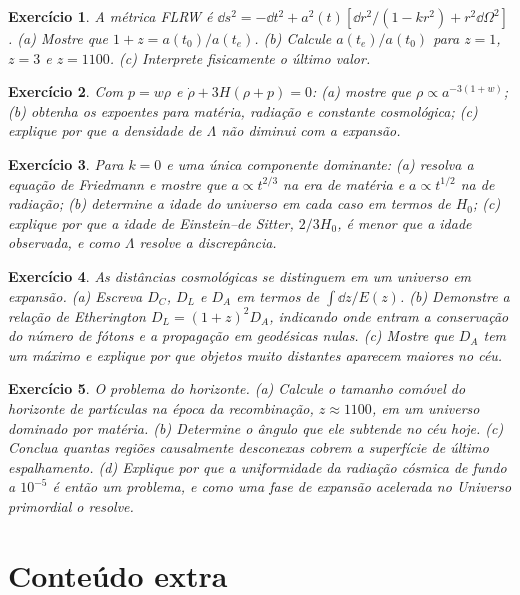 \documentclass[12pt,a4paper,oneside]{book}
\theoremstyle{rgplain}
\newtheorem{exercise}{Exercício}[chapter]
\theoremstyle{rgremark}
\begin{document}
\begin{exercise}
A métrica FLRW é
$\dd s^2=-\dd t^2+a^2(t)[\dd r^2/(1-kr^2)+r^2\dd\Omega^2]$.
(a) Mostre que $1+z=a(t_0)/a(t_e)$. (b) Calcule $a(t_e)/a(t_0)$ para
$z=1$, $z=3$ e $z=1100$. (c) Interprete fisicamente o último valor.
\end{exercise}

\begin{exercise}
Com $p=w\rho$ e $\dot\rho+3H(\rho+p)=0$: (a) mostre que
$\rho\propto a^{-3(1+w)}$; (b) obtenha os expoentes para matéria, radiação e
constante cosmológica; (c) explique por que a densidade de $\Lambda$ não
diminui com a expansão.
\end{exercise}

\begin{exercise}
Para $k=0$ e uma única componente dominante: (a) resolva a equação de
Friedmann e mostre que $a\propto t^{2/3}$ na era de matéria e
$a\propto t^{1/2}$ na de radiação; (b) determine a idade do universo em cada
caso em termos de $H_0$; (c) explique por que a idade de Einstein--de Sitter,
$2/3H_0$, é menor que a idade observada, e como $\Lambda$ resolve a
discrepância.
\end{exercise}

\begin{exercise}
As distâncias cosmológicas se distinguem em um universo em expansão.
(a) Escreva $D_C$, $D_L$ e $D_A$ em termos de $\int\dd z/E(z)$.
(b) Demonstre a relação de Etherington $D_L=(1+z)^2D_A$, indicando onde entram
a conservação do número de fótons e a propagação em geodésicas nulas.
(c) Mostre que $D_A$ tem um máximo e explique por que objetos muito distantes
aparecem \emph{maiores} no céu.
\end{exercise}

\begin{exercise}
O problema do horizonte. (a) Calcule o tamanho comóvel do horizonte de
partículas na época da recombinação, $z\approx1100$, em um universo dominado
por matéria. (b) Determine o ângulo que ele subtende no céu hoje. (c) Conclua
quantas regiões causalmente desconexas cobrem a superfície de último
espalhamento. (d) Explique por que a uniformidade da radiação cósmica de fundo
a $10^{-5}$ é então um problema, e como uma fase de expansão acelerada no
Universo primordial o resolve.
\end{exercise}


\section{Conteúdo extra}
\end{document}
